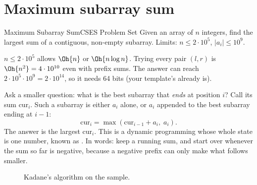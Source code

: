 \section[Maximum subarray sum]{Maximum subarray sum \hfill \silver}\label{wp:kadane}

\begin{statement}{Maximum Subarray Sum}{CSES Problem Set}
Given an array of $n$ integers, find the largest sum of a contiguous, non-empty subarray.
Limits: $n \le 2\cdot 10^5$, $|a_i| \le 10^9$.
\end{statement}

 $n \le 2\cdot10^5$ allows $\Oh{n}$ or $\Oh{n\log n}$. Trying every pair $(l, r)$ is
$\Oh{n^2} = 4\cdot10^{10}$ even with prefix sums. The answer can reach $2\cdot10^5\cdot10^9 = 2\cdot10^{14}$, so it needs
64 bits (your template's  already is).

 Ask a smaller question: what is the best subarray that \emph{ends} at position $i$? Call its sum
$\mathrm{cur}_i$. Such a subarray is either $a_i$ alone, or $a_i$ appended to the best subarray ending at $i-1$:
\[
  \mathrm{cur}_i = \max(\mathrm{cur}_{i-1} + a_i,\; a_i).
\]
The answer is the largest $\mathrm{cur}_i$. This is a dynamic programming whose whole state is one number, known as
. In words: keep a running sum, and start over whenever the sum so far is negative, because a
negative prefix can only make what follows smaller.

\begin{figure}[H]
\centering
{}
\caption{Kadane's algorithm on the sample.}
\end{figure}

